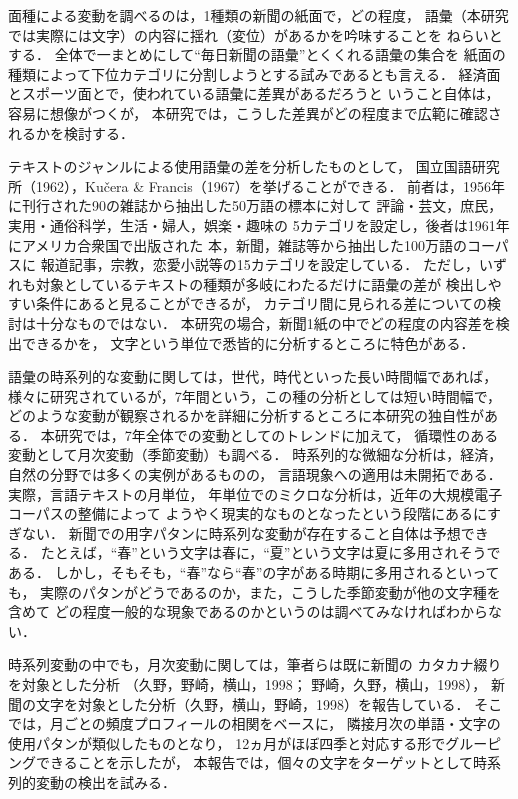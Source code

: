   面種による変動を調べるのは，1種類の新聞の紙面で，どの程度，
語彙（本研究では実際には文字）の内容に揺れ（変位）があるかを吟味することを
ねらいとする．
全体で一まとめにして“毎日新聞の語彙”とくくれる語彙の集合を
紙面の種類によって下位カテゴリに分割しようとする試みであるとも言える．
経済面とスポーツ面とで，使われている語彙に差異があるだろうと
いうこと自体は，容易に想像がつくが，
本研究では，こうした差異がどの程度まで広範に確認されるかを検討する．

  テキストのジャンルによる使用語彙の差を分析したものとして，
国立国語研究所（1962），Ku\v{c}era \& Francis（1967）を挙げることができる．
前者は，1956年に刊行された90の雑誌から抽出した50万語の標本に対して
評論・芸文，庶民，実用・通俗科学，生活・婦人，娯楽・趣味の
5カテゴリを設定し，後者は1961年にアメリカ合衆国で出版された
本，新聞，雑誌等から抽出した100万語のコーパスに
報道記事，宗教，恋愛小説等の15カテゴリを設定している．
ただし，いずれも対象としているテキストの種類が多岐にわたるだけに語彙の差が
検出しやすい条件にあると見ることができるが，
カテゴリ間に見られる差についての検討は十分なものではない．
本研究の場合，新聞1紙の中でどの程度の内容差を検出できるかを，
文字という単位で悉皆的に分析するところに特色がある．

  語彙の時系列的な変動に関しては，世代，時代といった長い時間幅であれば，
様々に研究されているが，7年間という，この種の分析としては短い時間幅で，
どのような変動が観察されるかを詳細に分析するところに本研究の独自性がある．
本研究では，7年全体での変動としてのトレンドに加えて，
循環性のある変動として月次変動（季節変動）も調べる．
時系列的な微細な分析は，経済，自然の分野では多くの実例があるものの，
言語現象への適用は未開拓である．実際，言語テキストの月単位，
年単位でのミクロな分析は，近年の大規模電子コーパスの整備によって
ようやく現実的なものとなったという段階にあるにすぎない．
新聞での用字パタンに時系列な変動が存在すること自体は予想できる．
たとえば，“春”という文字は春に，“夏”という文字は夏に多用されそうである．
しかし，そもそも，“春”なら“春”の字がある時期に多用されるといっても，
実際のパタンがどうであるのか，また，こうした季節変動が他の文字種を含めて
どの程度一般的な現象であるのかというのは調べてみなければわからない．

  時系列変動の中でも，月次変動に関しては，筆者らは既に新聞の
カタカナ綴りを対象とした分析
（久野，野崎，横山，1998； 野崎，久野，横山，1998），
新聞の文字を対象とした分析（久野，横山，野崎，1998）を報告している．
そこでは，月ごとの頻度プロフィールの相関をベースに，
隣接月次の単語・文字の使用パタンが類似したものとなり，
12ヵ月がほぼ四季と対応する形でグルーピングできることを示したが，
本報告では，個々の文字をターゲットとして時系列的変動の検出を試みる．

